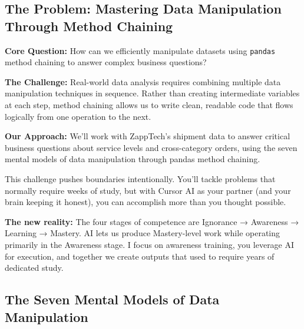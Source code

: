 \documentclass[
]{article}
\begin{document}
\subsection{The Problem: Mastering Data Manipulation Through Method
Chaining}\label{the-problem-mastering-data-manipulation-through-method-chaining}

\textbf{Core Question:} How can we efficiently manipulate datasets using
\texttt{pandas} method chaining to answer complex business questions?

\textbf{The Challenge:} Real-world data analysis requires combining
multiple data manipulation techniques in sequence. Rather than creating
intermediate variables at each step, method chaining allows us to write
clean, readable code that flows logically from one operation to the
next.

\textbf{Our Approach:} We'll work with ZappTech's shipment data to
answer critical business questions about service levels and
cross-category orders, using the seven mental models of data
manipulation through pandas method chaining.

\begin{tcolorbox}[enhanced jigsaw, colbacktitle=quarto-callout-warning-color!10!white, toptitle=1mm, colframe=quarto-callout-warning-color-frame, bottomtitle=1mm, colback=white, left=2mm, breakable, coltitle=black, bottomrule=.15mm, rightrule=.15mm, titlerule=0mm, opacityback=0, title=\textcolor{quarto-callout-warning-color}{\faExclamationTriangle}\hspace{0.5em}{⚠️ AI Partnership Required}, arc=.35mm, opacitybacktitle=0.6, toprule=.15mm, leftrule=.75mm]

This challenge pushes boundaries intentionally. You'll tackle problems
that normally require weeks of study, but with Cursor AI as your partner
(and your brain keeping it honest), you can accomplish more than you
thought possible.

\textbf{The new reality:} The four stages of competence are Ignorance →
Awareness → Learning → Mastery. AI lets us produce Mastery-level work
while operating primarily in the Awareness stage. I focus on awareness
training, you leverage AI for execution, and together we create outputs
that used to require years of dedicated study.

\end{tcolorbox}

\subsection{The Seven Mental Models of Data
Manipulation}\label{the-seven-mental-models-of-data-manipulation}
\end{document}
